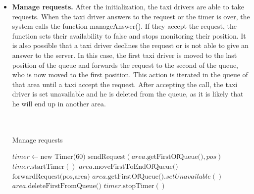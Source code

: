 \begin{itemize}
			
			\newpage
			\item \textbf{Manage requests.} After the initialization, the taxi drivers are able to take requests. When the taxi driver answers to the request or the timer is over, the system calls the function manageAnswer(). If they accept the request, the function sets their availability to false and stops monitoring their position. It is also possible that a taxi driver declines the request or is not able to give an answer to the server. In this case, the first taxi driver is moved to the last position of the queue and forwards the request to the second of the queue, who is now moved to the first position. This action is iterated in the queue of that area until a taxi accept the request. After accepting the call, the taxi driver is set unavailable and he is deleted from the queue, as it is likely that he will end up in another area.\\
			 \\\\
				\begin{algorithm}
					\caption{Manage requests}
					\begin{algorithmic}[1]
						\State $timer \gets \text{new Timer(60)}$
						\State $\text{sendRequest}(area.\text{getFirstOfQueue()}, pos)$
						\State $timer.\text{startTimer}()$
						\EndProcedure
							\State $area.\text{moveFirstToEndOfQueue()}$
							\State $\text{forwardRequest(pos,area)}$
						\EndIf
							\State $area.\text{getFirstOfQueue()}.setUnavailable()$
							\State $area.\text{deleteFirstFromQueue()}$
						\EndIf
						\State $timer.\text{stopTimer}()$
						\EndProcedure
					\end{algorithmic}
				\end{algorithm}
			

\end{itemize}
